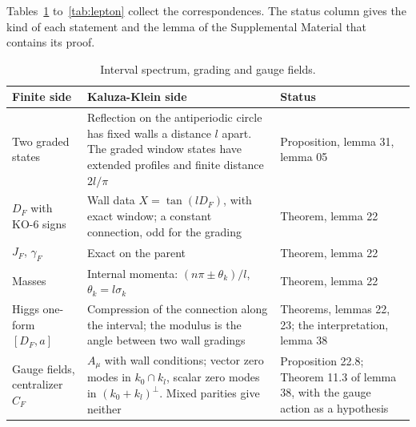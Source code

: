 \documentclass[aps,prd,reprint,onecolumn,nofootinbib,amsmath,amssymb,floatfix]{revtex4-2}
\theoremstyle{plain}
\begin{document}
Tables~\ref{tab:dictionary} to~\ref{tab:lepton} collect the correspondences. The status column gives the kind of each statement and the lemma of the Supplemental Material that contains its proof.

\begin{table}
\caption{\label{tab:dictionary}Interval spectrum, grading and gauge fields.}
\setlength{\tabcolsep}{0.01\textwidth}
\begin{ruledtabular}
\begin{tabular}{p{}p{}p{}}
Finite side&Kaluza-Klein side&Status\\
\hline
Two graded states&Reflection on the antiperiodic circle has fixed walls a distance $l$ apart. The graded window states have extended profiles and finite distance $2l/\pi$&Proposition, lemma 31, lemma 05\\
$D_F$ with KO-6 signs&Wall data $X=\tan(lD_F)$, with exact window; a constant connection, odd for the grading&Theorem, lemma 22\\
$J_F$, $\gamma_F$&Exact on the parent&Theorem, lemma 22\\
Masses&Internal momenta: $(n\pi\pm\theta_k)/l$, $\theta_k=l\sigma_k$&Theorem, lemma 22\\
Higgs one-form $[D_F,a]$&Compression of the connection along the interval; the modulus is the angle between two wall gradings&Theorems, lemmas 22, 23; the interpretation, lemma 38\\
Gauge fields, centralizer $C_F$&$A_\mu$ with wall conditions; vector zero modes in $k_0\cap k_l$, scalar zero modes in $(k_0+k_l)^\perp$. Mixed parities give neither&Proposition 22.8; Theorem 11.3 of lemma 38, with the gauge action as a hypothesis\\
\end{tabular}
\end{ruledtabular}
\end{table}
\end{document}

